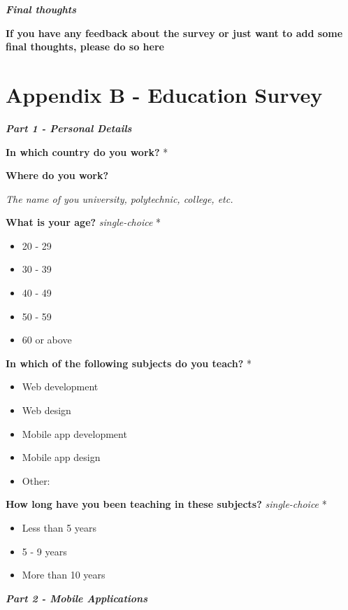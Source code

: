 \documentclass[a4paper,12pt]{article}
\begin{document}
\quad

\textbf{\textit{Final thoughts}}

\textbf{If you have any feedback about the survey or just want to add some final thoughts, please do so here}

\newpage
\section{Appendix B - Education Survey} 
\label{Appendix_eduSurvey}

\textbf{\textit{Part 1 - Personal Details}}

\textbf{In which country do you work?} *

\quad

\textbf{Where do you work?}

\textit{The name of you university, polytechnic, college, etc.}

\quad

\textbf{What is your age?}  \textit{single-choice} *
\begin{itemize}
    \item 20 - 29
    \item 30 - 39
    \item 40 - 49
    \item 50 - 59
    \item 60 or above
\end{itemize}


\textbf{In which of the following subjects do you teach?} *
\begin{itemize}
    \item Web development
    \item Web design
    \item Mobile app development
    \item Mobile app design
    \item Other:
\end{itemize}

\textbf{How long have you been teaching in these subjects?} \textit{single-choice} *
\begin{itemize}
    \item Less than 5 years
    \item 5 - 9 years
    \item More than 10 years
\end{itemize}

\quad

\quad

\textbf{\textit{Part 2 - Mobile Applications}}
\end{document}
